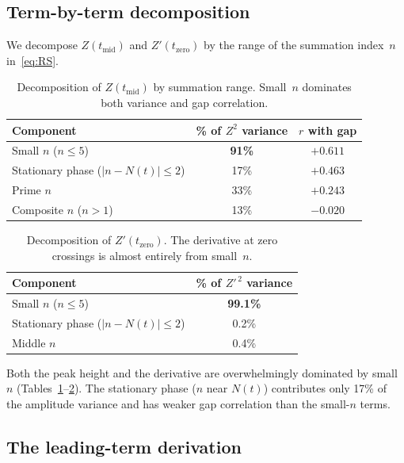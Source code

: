 \documentclass[11pt,a4paper]{article}
\begin{document}
\subsection{Term-by-term decomposition}

We decompose $Z(t_{\mathrm{mid}})$ and $Z'(t_{\mathrm{zero}})$ by the range of the summation index~$n$ in~\eqref{eq:RS}.

\begin{table}[ht]
\centering
\begin{tabular}{@{}lcc@{}}
\toprule
Component & \% of $Z^2$ variance & $r$ with gap \\
\midrule
Small $n$ ($n \le 5$)                & \textbf{91\%} & $\mathbf{+0.611}$ \\
Stationary phase ($|n - N(t)| \le 2$) & 17\%          & $+0.463$ \\
Prime $n$                            & 33\%          & $+0.243$ \\
Composite $n$ ($n > 1$)              & 13\%          & $-0.020$ \\
\bottomrule
\end{tabular}
\caption{Decomposition of $Z(t_{\mathrm{mid}})$ by summation range. Small~$n$ dominates both variance and gap correlation.}
\label{tab:Zdecomp}
\end{table}

\begin{table}[ht]
\centering
\begin{tabular}{@{}lc@{}}
\toprule
Component & \% of $Z'^{\,2}$ variance \\
\midrule
Small $n$ ($n \le 5$)                & \textbf{99.1\%} \\
Stationary phase ($|n - N(t)| \le 2$) & 0.2\% \\
Middle $n$                           & 0.4\% \\
\bottomrule
\end{tabular}
\caption{Decomposition of $Z'(t_{\mathrm{zero}})$. The derivative at zero crossings is almost entirely from small~$n$.}
\label{tab:Zpdecomp}
\end{table}

Both the peak height and the derivative are overwhelmingly dominated by small~$n$ (Tables~\ref{tab:Zdecomp}--\ref{tab:Zpdecomp}).
The stationary phase ($n$ near $N(t)$) contributes only 17\% of the amplitude variance and has weaker gap correlation than the small-$n$ terms.

\subsection{The leading-term derivation}
\end{document}
